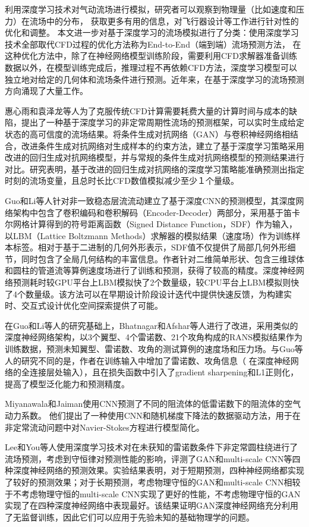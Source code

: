 利用深度学习技术对气动流场进行模拟，研究者可以观察到物理量（比如速度和压力）在流场中的分布，
获取更多有用的信息，对飞行器设计等工作进行针对性的优化和调整。
本文进一步对基于深度学习的流场模拟进行了分类：使用深度学习技术全部取代CFD过程的优化方法称为End-to-End（端到端）流场预测方法，
在这种优化方法中，除了在神经网络模型训练阶段，需要利用CFD求解器准备训练数据以外，在模型训练完成后，推理过程不再依赖CFD方法，深度学习模型可以独立地对给定的几何体和流场条件进行预测。近年来，在基于深度学习的流场预测方向涌现了大量工作。

惠心雨和袁泽龙等人\cite{惠心雨2019}为了克服传统CFD计算需要耗费大量的计算时间与成本的缺陷，提出了一种基于深度学习的非定常周期性流场的预测框架，可以实时生成给定状态的高可信度的流场结果。将条件生成对抗网络（GAN）与卷积神经网络相结合，改进条件生成对抗网络对生成样本的约束方法，建立了基于深度学习策略采用改进的回归生成对抗网络模型，并与常规的条件生成对抗网络模型的预测结果进行对比。研究表明，基于改进的回归生成对抗网络的深度学习策略能准确预测出指定时刻的流场变量，且总时长比CFD数值模拟减少至少１个量级。

Guo和Li等人\cite{DBLP:conf/kdd/GuoLI16}针对非一致稳态层流流动建立了基于深度CNN的预测模型，其深度网络架构中包含了卷积编码和卷积解码（Encoder-Decoder）两部分，采用基于笛卡尔网格计算得到的符号距离函数（Signed Distance Function，SDF）作为输入，以LBM（Lattice Boltzmann Methods）求解器的模拟结果（速度场）作为训练样本标签。相对于基于二进制的几何外形表示，SDF值不仅提供了局部几何外形细节，同时包含了全局几何结构的丰富信息。作者针对二维简单形状、包含三维球体和圆柱的管道流等算例速度场进行了训练和预测，获得了较高的精度。深度神经网络预测耗时较GPU平台上LBM模拟快了2个数量级，较CPU平台上LBM模拟则快了4个数量级。该方法可以在早期设计阶段设计迭代中提供快速反馈，为构建实时、交互式设计优化空间探索提供了可能。

在Guo和Li等人的研究基础上，Bhatnagar和Afshar等人\cite{bhatnagar2019prediction}进行了改进，采用类似的深度神经网络架构，以3个翼型、4个雷诺数、21个攻角构成的RANS模拟结果作为训练数据，预测未知翼型、雷诺数、攻角的测试算例的速度场和压力场。与Guo等人的研究不同的是，作者在训练输入中增加了雷诺数、攻角信息（ 在深度神经网络的全连接层处输入），且在损失函数中引入了gradient sharpening和L1正则化，提高了模型泛化能力和预测精度。

Miyanawala和Jaiman\cite{2017An}使用CNN预测了不同的阻流体的低雷诺数下的阻流体的空气动力系数。 他们提出了一种使用CNN和随机梯度下降法的数据驱动方法，用于在非定常流动问题中对Navier-Stokes方程进行模型简化。

Lee和You等人\cite{lee2019data}使用深度学习技术对在未获知的雷诺数条件下非定常圆柱绕进行了流场预测，考虑到守恒律对预测性能的影响，评测了GAN和multi-scale CNN等四种深度神经网络的预测效果。实验结果表明，对于短期预测，四种神经网络都实现了较好的预测效果；对于长期预测，考虑物理守恒的GAN和multi-scale CNN相较于不考虑物理守恒的multi-scale CNN实现了更好的性能，不考虑物理守恒的GAN实现了在四种深度神经网络中表现最好。该结果证明GAN深度神经网络充分利用了无监督训练，因此它们可以应用于先验未知的基础物理学的问题。

